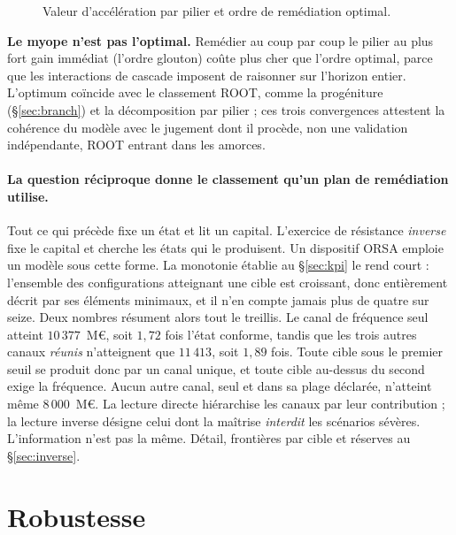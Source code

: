 \begin{figure}[htbp]\centering
{}
\caption{Valeur d'accélération par pilier et ordre de remédiation optimal.}
\label{fig:prio}
\end{figure}

\begin{cle}
\textbf{Le myope n'est pas l'optimal.} Remédier au coup par coup le pilier au plus fort gain
immédiat (l'ordre glouton) coûte plus cher que l'ordre optimal, parce que les interactions de
cascade imposent de raisonner sur l'horizon entier. L'optimum coïncide avec le classement
ROOT, comme la progéniture (\S\ref{sec:branch}) et la décomposition par pilier ; ces trois
convergences attestent la cohérence du modèle avec le jugement dont il procède, non une
validation indépendante, ROOT entrant dans les amorces.
\end{cle}

\paragraph{La question réciproque donne le classement qu'un plan de
remédiation utilise.} Tout ce qui précède fixe un état et lit un capital. L'exercice de
résistance \emph{inverse} fixe le capital et cherche les états qui le produisent. Un dispositif ORSA emploie un modèle sous
cette forme. La monotonie établie au \S\ref{sec:kpi} le
rend court : l'ensemble des configurations atteignant une cible est croissant, donc entièrement
décrit par ses éléments minimaux, et il n'en compte jamais plus de quatre sur seize. Deux nombres
résument alors tout le treillis. Le canal de fréquence seul atteint $10\,377$~M\euro,
soit $1{,}72$ fois l'état conforme, tandis que les trois autres canaux \emph{réunis} n'atteignent
que $11\,413$, soit $1{,}89$ fois. Toute cible sous le premier seuil se produit donc par un canal
unique, et toute cible au-dessus du second exige la fréquence. Aucun autre canal, seul et
dans sa plage déclarée, n'atteint même $8\,000$~M\euro. La lecture directe hiérarchise les canaux
par leur contribution ; la lecture inverse désigne celui dont la maîtrise \emph{interdit} les
scénarios sévères. L'information n'est pas la même. Détail, frontières par cible et réserves
au \S\ref{sec:inverse}.

\section{Robustesse}

